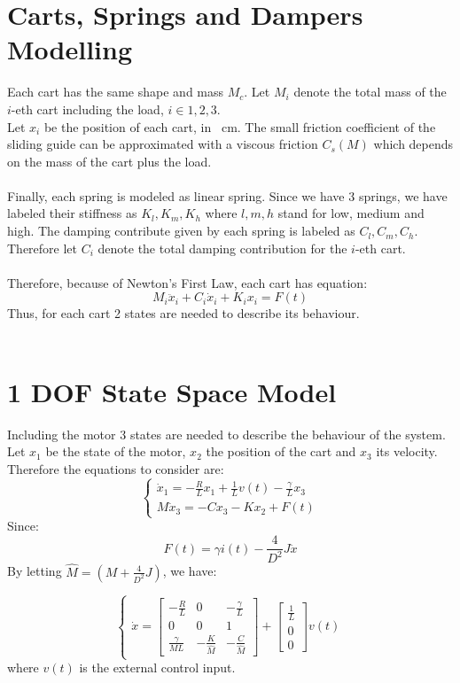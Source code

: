 \section{Carts, Springs and Dampers Modelling}
Each cart has the same shape and mass $M_{c}$. Let $M_{i}$ denote the total mass of the $i$-eth cart including the load, $i \in {1,2,3}$. \\
Let $x_{i}$ be the position of each cart, in \SI{}{\cm}. The small friction coefficient of the sliding guide can be approximated with a viscous friction $C_{s}(M)$ which depends on the mass of the cart plus the load. \\ \\
Finally, each spring is modeled as linear spring. Since we have 3 springs, we have labeled their stiffness as $K_l, K_m, K_h$ where $l,m,h$ stand for low, medium and high. The damping contribute given by each spring is labeled as $C_l, C_m, C_h$. Therefore let $C_{i}$ denote the total damping contribution for the $i$-eth cart.\\ \\
Therefore, because of Newton's First Law, each cart has equation:
$$M_i \ddot{x}_i + C_{i} \dot{x}_i + K_{i}x_{i}=F(t)$$
Thus, for each cart 2 states are needed to describe its behaviour.\\ \\
\section{1 DOF State Space Model}
Including the motor 3 states are needed to describe the behaviour of the system. Let $x_{1}$ be the state of the motor, $x_{2}$ the position of the cart and $x_{3}$ its velocity. Therefore the equations to consider are:
\begin{equation}
\begin{cases}
\dot{x}_1 = -\frac{R}{L}x_{1}+\frac{1}{L} v(t)-\frac{\gamma}{L}x_3  \\
M\dot{x}_3 = -Cx_3 -K x_2 + F(t)
\end{cases}
\end{equation}
Since:
$$F(t)=\gamma i(t) - \frac{4}{D^2}J \ddot{x}$$
By letting $\hat{M} = (M+\frac{4}{D^2}J)$, we have:

\begin{equation}
\begin{cases}
\dot{x}=\begin{bmatrix}
-\frac{R}{L} &0 & -\frac{\gamma}{L} \\
0 & 0 & 1 \\ 
 \frac{\gamma}{ML} & -\frac{K}{\hat{M}} & -\frac{C}{\hat{M}}
\end{bmatrix}
+
\begin{bmatrix}\frac{1}{L} \\ 0 \\ 0\end{bmatrix} v(t)
\end{cases}
\end{equation}
where $v(t)$ is the external control input.
